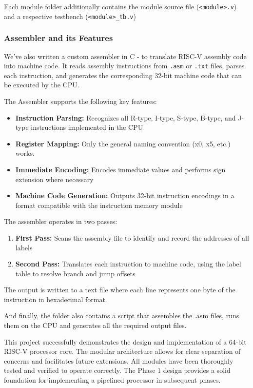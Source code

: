 \documentclass[journal]{IEEEtran}
\begin{document}
Each module folder additionally contains the module source file
(\texttt{<module>.v}) and a respective testbench (\texttt{<module>\_tb.v})

\subsubsection{Assembler and its Features}
We've also written a custom assembler in C - to translate RISC-V assembly code
into machine code. It reads assembly instructions from \texttt{.asm} or
\texttt{.txt} files, parses each instruction, and generates the corresponding
32-bit machine code that can be executed by the CPU.

The Assembler supports the following key features:

\begin{itemize}
    \item \textbf{Instruction Parsing:} Recognizes all R-type, I-type, S-type,
          B-type, and J-type instructions implemented in the CPU
    \item \textbf{Register Mapping:} Only the general naming convention (x0, x5,
          etc.) works.
    \item \textbf{Immediate Encoding:} Encodes immediate values and
          performs sign extension where necessary
    \item \textbf{Machine Code Generation:} Outputs 32-bit instruction encodings
          in a format compatible with the instruction memory module
\end{itemize}

The assembler operates in two passes:

\begin{enumerate}
    \item \textbf{First Pass:} Scans the assembly file to identify and record the
          addresses of all labels
    \item \textbf{Second Pass:} Translates each instruction to machine code, using
          the label table to resolve branch and jump offsets
\end{enumerate}

The output is written to a text file where each line represents one byte of the
instruction in hexadecimal format.

And finally, the folder also contains a script that assembles the .asm files,
runs them on the CPU and generates all the required output files.

This project successfully demonstrates the design and implementation of a 64-bit
RISC-V processor core. The modular architecture allows for clear separation of
concerns and facilitates future extensions. All modules have been thoroughly
tested and verified to operate correctly. The Phase 1 design provides a solid
foundation for implementing a pipelined processor in subsequent phases.
\end{document}
